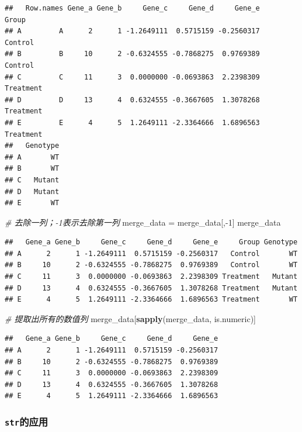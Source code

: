 \documentclass[]{article}
\newenvironment{Shaded}{\begin{snugshade}}{\end{snugshade}}
\newcommand{\KeywordTok}[1]{\textcolor[rgb]{0.13,0.29,0.53}{\textbf{{#1}}}}
\newcommand{\DecValTok}[1]{\textcolor[rgb]{0.00,0.00,0.81}{{#1}}}
\newcommand{\StringTok}[1]{\textcolor[rgb]{0.31,0.60,0.02}{{#1}}}
\newcommand{\CommentTok}[1]{\textcolor[rgb]{0.56,0.35,0.01}{\textit{{#1}}}}
\newcommand{\NormalTok}[1]{{#1}}
\numberwithin{figure}{section}
\numberwithin{table}{section}
\theoremstyle{definition}
\theoremstyle{definition}
\theoremstyle{definition}
\theoremstyle{remark}
\begin{document}
\begin{verbatim}
##   Row.names Gene_a Gene_b     Gene_c     Gene_d     Gene_e     Group
## A         A      2      1 -1.2649111  0.5715159 -0.2560317   Control
## B         B     10      2 -0.6324555 -0.7868275  0.9769389   Control
## C         C     11      3  0.0000000 -0.0693863  2.2398309 Treatment
## D         D     13      4  0.6324555 -0.3667605  1.3078268 Treatment
## E         E      4      5  1.2649111 -2.3364666  1.6896563 Treatment
##   Genotype
## A       WT
## B       WT
## C   Mutant
## D   Mutant
## E       WT
\end{verbatim}

\begin{Shaded}
\begin{Highlighting}[]
\CommentTok{# 去除一列；-1表示去除第一列}
\NormalTok{merge_data =}\StringTok{ }\NormalTok{merge_data[,-}\DecValTok{1}\NormalTok{]}
\NormalTok{merge_data}
\end{Highlighting}
\end{Shaded}

\begin{verbatim}
##   Gene_a Gene_b     Gene_c     Gene_d     Gene_e     Group Genotype
## A      2      1 -1.2649111  0.5715159 -0.2560317   Control       WT
## B     10      2 -0.6324555 -0.7868275  0.9769389   Control       WT
## C     11      3  0.0000000 -0.0693863  2.2398309 Treatment   Mutant
## D     13      4  0.6324555 -0.3667605  1.3078268 Treatment   Mutant
## E      4      5  1.2649111 -2.3364666  1.6896563 Treatment       WT
\end{verbatim}

\begin{Shaded}
\begin{Highlighting}[]
\CommentTok{# 提取出所有的数值列}
\NormalTok{merge_data[}\KeywordTok{sapply}\NormalTok{(merge_data, is.numeric)]}
\end{Highlighting}
\end{Shaded}

\begin{verbatim}
##   Gene_a Gene_b     Gene_c     Gene_d     Gene_e
## A      2      1 -1.2649111  0.5715159 -0.2560317
## B     10      2 -0.6324555 -0.7868275  0.9769389
## C     11      3  0.0000000 -0.0693863  2.2398309
## D     13      4  0.6324555 -0.3667605  1.3078268
## E      4      5  1.2649111 -2.3364666  1.6896563
\end{verbatim}

\subsubsection{\texorpdfstring{\texttt{str}的应用}{str的应用}}\label{str}
\end{document}
